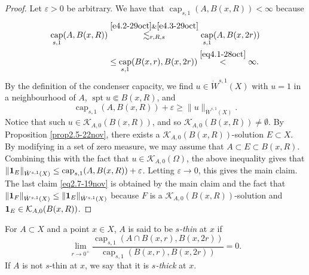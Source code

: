 \documentclass[11pt,leqno]{amsart}
\numberwithin{equation}{section}
\theoremstyle{definition}
\DeclareMathOperator{\capp}{cap}
\newcommand{\caps}{\capp_{s,1}}
\DeclareMathOperator{\supp}{spt}
\begin{document}
	\begin{proof}
		Let $\varepsilon>0$ be arbitrary. 
		We have that $\caps(A,B(x,R))<\infty$ because
		\begin{align*}
			\caps(A,B(x,R)) & \overset{\eqref{e4.2-29oct} \& \eqref{e4.3-29oct}}{\lesssim_{r,R,s}} \caps (A, B(x,2r))\\
			&\leq \caps (B(x,r), B(x,2r)) \overset{\eqref{eq4.1-28oct}}{<}\infty.
		\end{align*}
		By the definition of the condenser capacity, we find $u\in \dot W^{s,1}(X)$ with $u= 1$ in a neighbourhood of $A$, $\supp u \Subset  B(x,R)$, and
		\[
		\caps(A,B(x,R))+\varepsilon\ge \|u\|_{\dot W^{s,1}(X)}.
		\]
		Notice that such $u\in \mathcal{K}_{A,0}(B(x,R))$, and so
		$\mathcal K_{A,0}(B(x,R))\neq\emptyset$. 
		By Proposition \ref{prop2.5-22nov}, 
		there exists a $\mathcal{K}_{A,0}(B(x,R))$-solution $E\subset X$. By modifying in a set of zero measure, we may assume that $A\subset E\subset B(x,R)$.
		Combining this with the fact that $u\in \mathcal{K}_{A,0}(\Omega)$, the above inequality gives that 
		$\|{\bf 1}_{E}\|_{\dot W^{s,1}(X)}\leq \caps(A,B(x,R)) +\varepsilon$. Letting $\varepsilon\to0$, this gives the main claim.
		The last claim \eqref{eq2.7-19nov} is obtained by the main claim and the fact that $\|{\bf 1}_{F}\|_{\dot W^{s,1}(X)}\leq \|{\bf 1}_{E}\|_{\dot W^{s,1}(X)}$ because $F$ is a $\mathcal{K}_{A,0}(B(x,R))$-solution and ${\bf 1}_E\in \mathcal K_{A,0}(B(x,R))$.
	\end{proof}
	
	
	
	For $A\subset X$ and a point $x\in X$,
	$A$ is said to be \emph{$s$-thin} at $x$ if
	\begin{equation}\label{eq2.8-2011}
		\lim_{r\to0^+} \frac{\caps(A\cap B(x,r), B(x,2r))}{\caps(B(x,r),B(x,2r))} =0.
	\end{equation}
	If $A$ is not $s$-thin at $x$, we say that it is \emph{$s$-thick} at $x$. 
	
\end{document}
